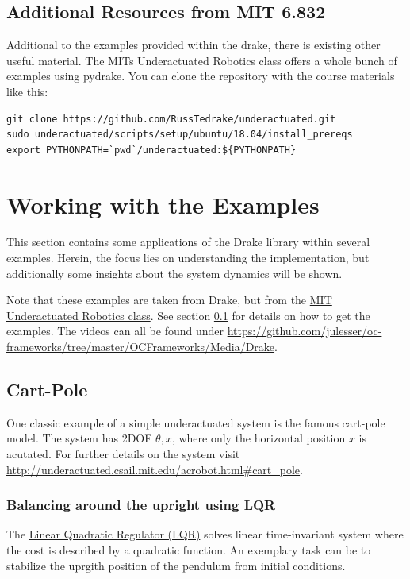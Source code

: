 \subsection{Additional Resources from MIT 6.832}\label{subsec:mit}
Additional to the examples provided within the drake, there is existing other useful material. The MITs Underactuated Robotics class \cite{mitx6.832web} offers a whole bunch of examples using pydrake. You can clone the repository with the course materials like this:
\begin{verbatim}
git clone https://github.com/RussTedrake/underactuated.git
sudo underactuated/scripts/setup/ubuntu/18.04/install_prereqs
export PYTHONPATH=`pwd`/underactuated:${PYTHONPATH}
\end{verbatim}


\section{Working with the Examples}
This section contains some applications of the Drake library within several examples. Herein, the focus lies on understanding the implementation, but additionally some insights about the system dynamics will be shown. 

Note that these examples are taken from Drake, but from the \href{http://underactuated.csail.mit.edu/underactuated.html}{MIT Underactuated Robotics class}. See section \ref{subsec:mit} for details on how to get the examples. The videos can all be found under \url{https://github.com/julesser/oc-frameworks/tree/master/OCFrameworks/Media/Drake}. 

\subsection{Cart-Pole}
One classic example of a simple underactuated system is the famous cart-pole model. The system has 2DOF $\theta, x$, where only the horizontal position $x$ is acutated. 
For further details on the system visit \url{http://underactuated.csail.mit.edu/acrobot.html#cart_pole}.
\subsubsection{Balancing around the upright using LQR}
The \href{http://underactuated.csail.mit.edu/lqr.html}{Linear Quadratic Regulator (LQR)} solves linear time-invariant system where the cost is described by a quadratic function.
An exemplary task can be to stabilize the uprgith position of the pendulum from initial conditions.

